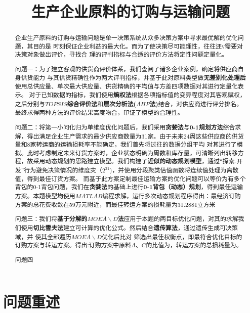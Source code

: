 \documentclass{cumcmthesis}
\title{生产企业原料的订购与运输问题}\tihao{A}
\begin{document}
\maketitle

\begin{abstract}
    企业生产原料的订购与运输问题是单一决策系统从众多决策方案中寻求最优解的优化问题，其目的是
    时刻保证企业利益的最大化。而为了使决策尽可能理性，往往还v需要对决策对象做出评价，寻找合
    理的评判指标与合适的评价方法将定性问题定量化。


    问题一：为了建立客观的供货商评价体系，我们查阅了诸多企业案例，确定将供应商自身供货能力
    与其供货精确性作为两大评判指标，并基于此对原料类型做\textbf{无差别化处理后}使用总供应量、单次最大供应量、供货精确的平均值与方差四项数据对其进行定量化表示。
    对于已知数据的指标，我们使用\textbf{熵权法}根据各项指标值的变异程度对其客观赋权，之后分别与\textbf{$TOPSIS$综合评价法}和\textbf{层次分析法($AHP$法)}结合，对供应商进行评分排名。
    最终求得两种方法的评价结果高度吻合，印证了模型的合理性。


    问题二：将第一小问化归为单维度优化问题后，我们采用\textbf{贪婪法}与\textbf{0-1规划方法}综合求解，得出满足企业生产需求的最少供应商数量为31家。由于未来24周这些供应商的供货量和8家转运商的运输损耗率不能确定，我们首先将过往的数据分组平均
    对其进行了模拟。此时考虑制定未来订货方案时，企业状态明确为周数和库存量，可清晰列出转移方程，故采用动态规划的思路建立模型。我们构建了\textbf{近似的动态规划模型}，通过“探索-开发”行为避免决策情况的维度灾（$2^{31}$)，并使用分段聚类估值函数将连续值处理为离散值，得到最佳订货方案。
    而基于此方案定制最佳运输方案的优化问题可以等价为有多个背包的0-1背包问题，我们在\textbf{贪婪法}的基础上进行\textbf{0-1背包（动态）规划}，得到最佳运输方案。本题模型均使用$MATLAB$编程求解，运行多次动态规划程序得出：最经济订购方案的总花费收敛在59万元附近，而最佳转运方案的损耗量为31.2881立方米


    问题三：我们将\textbf{基于分解的$MOEA\backslash D$\cite{RN13}法}应用于本题的两目标优化问题，对其的求解我们使用\textbf{切比雪夫法}建立可计算的优化公式。然后结合\textbf{遗传算法}，通过遗传生成可决策域，并 使其全部遍历$MOEA\backslash D$优化后比对
    筛选出最佳权衡点，即最符合优化目标的订购方案与转运方案。得出:订购方案中原料$A$、$C$的比值为，转运方案的总损耗量为。


    问题四
\end{abstract}

\section{问题重述}
\end{document}
